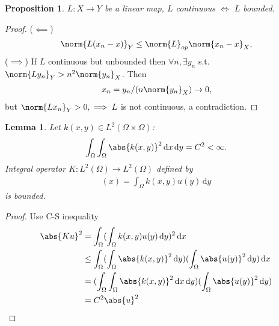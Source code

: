 \documentclass[a4paper]{book}
\newtheorem{lemma}[thm]{Lemma}
\newtheorem{prop}[thm]{Proposition}
\newcommand\diff{\,\mathrm{d}}
\DeclarePairedDelimiter{\norm}\lVert\rVert
\DeclarePairedDelimiter{\abs}\lvert\rvert
\begin{document}
\begin{prop}
    $L \colon X \to Y$ be a linear map, $L$ continuous $\iff$ $L$ bounded.
\end{prop}
\begin{proof}
    ($\impliedby$)
    \begin{gather*}
        \norm{L(x_n - x)}_Y \leq \norm{L}_{op}\norm{x_n - x}_X,
    \end{gather*}
    ($\implies$) If $L$ continuous but unbounded then $\forall n, \exists y_n$ s.t. $\norm{Ly_n}_Y > n^2\norm{y_n}_X$. Then
    \begin{gather*}
        x_n = y_n/(n\norm{y_n}_X) \to 0,
    \end{gather*}
    but $\norm{Lx_n}_Y > 0, \implies L$ is not continuous, a contradiction.
\end{proof}

\begin{lemma}\label{boundness_of_integral_operator}
    Let $k(x,y) \in L^2(\Omega \times \Omega)$:
    \begin{gather*}
        \int_{\Omega}\int_{\Omega}\abs{k(x,y)}^2 \diff x \diff y = C^2 < \infty.
    \end{gather*}
    Integral operator $K \colon L^2(\Omega) \to L^2(\Omega)$ defined by
    \begin{gather}
        [Ku](x)=\int_{\Omega}k(x,y)u(y) \diff y
    \end{gather}
    is bounded.
\end{lemma}
\begin{proof}
    Use C-S inequality
    \begin{align*}
        \abs{Ku}^2 & = \int_{\Omega}(\int_{\Omega}k(x,y)u(y) \diff y)^2 \diff x                                        \\
                   & \leq \int_{\Omega}(\int_{\Omega}\abs{k(x,y)}^2 \diff y)(\int_{\Omega}\abs{u(y)}^2 \diff y)\diff x \\
                   & = (\int_{\Omega}\int_{\Omega}\abs{k(x,y)}^2 \diff x \diff y)(\int_{\Omega}\abs{u(y)}^2 \diff y)   \\
                   & = C^2 \abs{u}^2
    \end{align*}
\end{proof}
\end{document}
